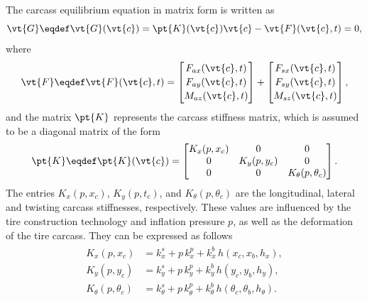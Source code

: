 The carcass equilibrium equation in matrix form is written as
%
\begin{equation}
  \vt{G} \eqdef \vt{G}(\vt{c}) = \pt{K}(\vt{c}) \vt{c} - \vt{F}(\vt{c},t) = 0,
  \label{chap4:eq:nls}
\end{equation}
%
where
%
\begin{equation}
  \vt{F} \eqdef \vt{F}(\vt{c},t) =
  \begin{bmatrix}
    F_{ax}(\vt{c},t) \\[0.2em]
    F_{ay}(\vt{c},t) \\[0.2em]
    M_{az}(\vt{c},t)
  \end{bmatrix} + \begin{bmatrix}
    F_{sx}(\vt{c},t) \\[0.2em]
    F_{sy}(\vt{c},t) \\[0.2em]
    M_{sz}(\vt{c},t)
  \end{bmatrix},
\end{equation}
%
and the matrix $\pt{K}$ represents the carcass stiffness matrix, which is assumed to be a diagonal matrix of the form
%
\begin{equation}
  \pt{K} \eqdef \pt{K}(\vt{c}) =
  \begin{bmatrix}
    K_x(p,x_c) & 0 & 0 \\
    0 & K_y(p,y_c) & 0 \\
    0 & 0 & K_\theta(p,\theta_c)
  \end{bmatrix}.
\end{equation}
%
The entries $K_x(p,x_c)$, $K_y(p,t_c)$, and $K_\theta(p,\theta_c)$ are the longitudinal, lateral and twisting carcass stiffnesses, respectively. These values are influenced by the tire construction technology and inflation pressure $p$, as well as the deformation of the tire carcass. They can be expressed as follows
%
\begin{equation}
  \begin{split}
    \begin{aligned}
      K_x(p,x_c)           &= k_x^s      + p \, k_x^p      + k_x^b \, h(x_c, x_b, h_x), \\
      K_y(p,y_c)           &= k_y^s      + p \, k_y^p      + k_y^b \, h(y_c, y_b, h_y), \\
      K_\theta(p,\theta_c) &= k_\theta^s + p \, k_\theta^p + k_\theta^b \, h(\theta_c, \theta_b, h_\theta). \\
    \end{aligned}
  \end{split}
\end{equation}
